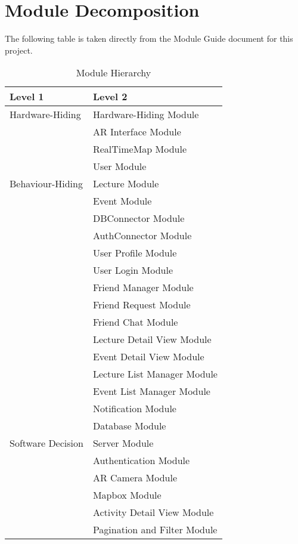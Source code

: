 \documentclass[12pt, titlepage]{article}
\begin{document}
\section{Module Decomposition}

The following table is taken directly from the Module Guide document for this project.

\begin{table}[h!]
\centering
\begin{tabular}{p{} p{}}
\toprule
\textbf{Level 1} & \textbf{Level 2}\\
\midrule

{Hardware-Hiding} & Hardware-Hiding Module \\
\midrule

\multirow{7}{0.3\textwidth}{Behaviour-Hiding}
& AR Interface Module\\
& RealTimeMap Module\\
& User Module\\
& Lecture Module\\
& Event Module\\
& DBConnector Module\\
& AuthConnector Module\\
& User Profile Module\\
& User Login Module\\
& Friend Manager Module\\ 
& Friend Request Module\\
& Friend Chat Module\\
& Lecture Detail View Module\\
& Event Detail View Module\\
& Lecture List Manager Module\\
& Event List Manager Module\\
& Notification Module\\
\midrule

\multirow{3}{0.3\textwidth}{Software Decision}
& Database Module\\
& Server Module\\
& Authentication Module\\
& AR Camera Module\\
& Mapbox Module\\
& Activity Detail View Module\\
& Pagination and Filter Module\\
\bottomrule

\end{tabular}
\caption{Module Hierarchy}
\label{TblMH}
\end{table}
\end{document}
